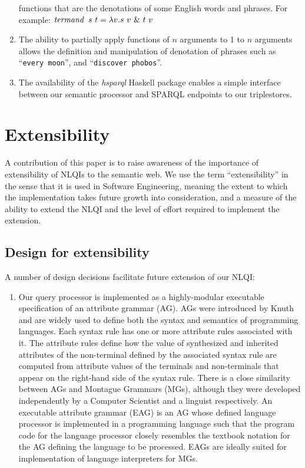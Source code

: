 \documentclass[../main.tex]{subfiles}
\begin{document}
\begin{refsection}
\begin{enumerate}
	functions that are the denotations of some English words and phrases. For example: $ \opit{termand}\ s\ t = \lambda v.s\ v\ \&\ t\ v  $
	\item The ability to partially apply functions of $n$ arguments to 1 to $n$ arguments allows the
	definition and manipulation of denotation of phrases such as ``\texttt{every moon}'', and ``\texttt{discover
	phobos}''.
	\item The availability of the \textit{hsparql} \cite{hsparql} Haskell package enables a simple interface between our
	semantic processor and SPARQL endpoints to our triplestores.
\end{enumerate}

\section{Extensibility}
\label{ext:extensible}

A contribution of this paper is to raise awareness of the importance of extensibility of NLQIs to
the semantic web. We use the term ``extensibility'' in the sense that it is used in Software Engineering,
meaning the extent to which the implementation takes future growth into consideration, and a
measure of the ability to extend the NLQI and the level of effort required to implement the extension.


\subsection{Design for extensibility}

A number of design decisions facilitate future extension of our NLQI:

\begin{enumerate}
	\item Our query processor is implemented as a highly-modular executable specification of an attribute grammar (AG). AGs were introduced by Knuth \cite{knuth1968semantics} and are
	widely used to define both the syntax and semantics of programming languages. Each syntax
	rule has one or more attribute rules associated with it. The attribute rules define how the value
	of synthesized and inherited attributes of the non-terminal defined by the
	associated syntax rule are computed from attribute values of the terminals and non-terminals
	that appear on the right-hand side of the syntax rule. There is a close similarity between AGs
	and Montague Grammars (MGs), although they were developed independently by a Computer
	Scientist and a linguist respectively. An executable attribute grammar (EAG) is an AG whose
	defined language processor is implemented in a programming language such that the program
	code for the language processor closely resembles the textbook notation for the AG defining
	the language to be processed. EAGs are ideally suited for
	implementation of language interpreters for MGs.


\end{enumerate}
\end{refsection}
\end{document}
